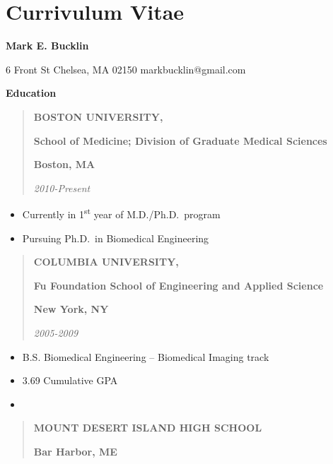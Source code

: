 \hypertarget{cv}{%
\chapter*{Currivulum Vitae}\label{sec:cv}}

\thispagestyle{empty}

\begin{center}
{\large {\bf Mark E. Bucklin}}
\end{center}

6 Front St
Chelsea, MA 02150
markbucklin@gmail.com

\textbf{Education}

\begin{quote}
\textbf{BOSTON UNIVERSITY,}

\textbf{School of Medicine; Division of Graduate Medical Sciences}

\textbf{Boston, MA}

\emph{2010-Present}
\end{quote}

\begin{itemize}
\item
  Currently in 1\textsuperscript{st} year of M.D./Ph.D.~program
\item
  Pursuing Ph.D.~in Biomedical Engineering
\end{itemize}

\begin{quote}
\textbf{COLUMBIA UNIVERSITY,}

\textbf{Fu Foundation School of Engineering and Applied Science}

\textbf{New York, NY}

\emph{2005-2009}
\end{quote}

\begin{itemize}
\item
  B.S. Biomedical Engineering -- Biomedical Imaging track
\item
  3.69 Cumulative GPA
\item
\end{itemize}

\begin{quote}
\textbf{MOUNT DESERT ISLAND HIGH SCHOOL}

\textbf{Bar Harbor, ME}
\end{quote}

